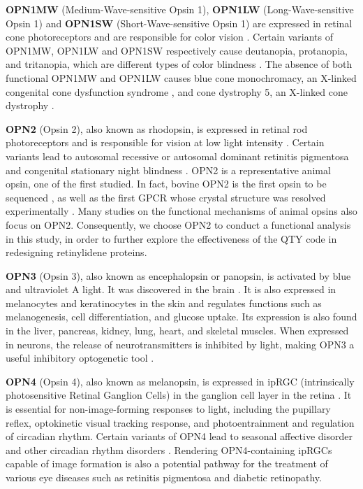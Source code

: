 \documentclass[fleqn, 10pt]{manuscript}
\begin{document}
\textbf{OPN1MW} (Medium-Wave-sensitive Opsin 1), \textbf{OPN1LW} (Long-Wave-sensitive Opsin 1) and \textbf{OPN1SW} (Short-Wave-sensitive Opsin 1) are expressed in retinal cone photoreceptors and are responsible for color vision \citep{Bowmaker_1980}. Certain variants of OPN1MW, OPN1LW and OPN1SW respectively cause deutanopia, protanopia, and tritanopia, which are different types of color blindness \citep{Ueyama_2002, Baraas_2012}. The absence of both functional OPN1MW and OPN1LW causes blue cone monochromacy, an X-linked congenital cone dysfunction syndrome \citep{Wissinger_2022}, and cone dystrophy 5, an X-linked cone dystrophy \citep{Gardner_2010}. 

\textbf{OPN2} (Opsin 2), also known as rhodopsin, is expressed in retinal rod photoreceptors and is responsible for vision at low light intensity \citep{Hubbard_1958}. Certain variants lead to autosomal recessive or autosomal dominant retinitis pigmentosa and congenital stationary night blindness \citep{Fanelli_2021}. OPN2 is a representative animal opsin, one of the first studied. In fact, bovine OPN2 is the first opsin to be sequenced \citep{Nathans_1984}, as well as the first GPCR whose crystal structure was resolved experimentally \citep{Palczeski_2000}. Many studies on the functional mechanisms of animal opsins also focus on OPN2. Consequently, we choose OPN2 to conduct a functional analysis in this study, in order to further explore the effectiveness of the QTY code in redesigning retinylidene proteins. 

\textbf{OPN3} (Opsin 3), also known as encephalopsin or panopsin, is activated by blue and ultraviolet A light. It was discovered in the brain \citep{Blackshaw_1999}. It is also expressed in melanocytes and keratinocytes in the skin and regulates functions such as melanogenesis, cell differentiation, and glucose uptake. Its expression is also found in the liver, pancreas, kidney, lung, heart, and skeletal muscles. When expressed in neurons, the release of neurotransmitters is inhibited by light, making OPN3 a useful inhibitory optogenetic tool \citep{Copits_2021}. 

\textbf{OPN4} (Opsin 4), also known as melanopsin, is expressed in ipRGC (intrinsically photosensitive Retinal Ganglion Cells) in the ganglion cell layer in the retina \citep{Provencio_1998}. It is essential for non-image-forming responses to light, including the pupillary reflex, optokinetic visual tracking response, and photoentrainment and regulation of circadian rhythm. Certain variants of OPN4 lead to seasonal affective disorder and other circadian rhythm disorders \citep{Berson_2002}. Rendering OPN4-containing ipRGCs capable of image formation is also a potential pathway for the treatment of various eye diseases such as retinitis pigmentosa and diabetic retinopathy. 
\end{document}

